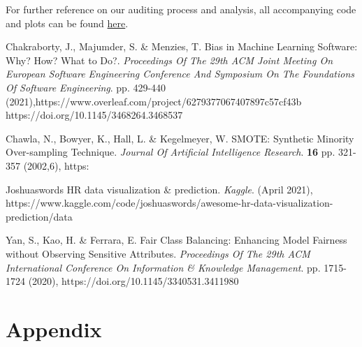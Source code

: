 For further reference on our auditing process and analysis, all accompanying code and plots can be found \href{https://github.com/cas2247/RDS_Algorithmic_Fairness}{here}.


\begin{thebibliography}{9}


%

Chakraborty, J., Majumder, S. \& Menzies, T. Bias in Machine Learning Software: Why? How? What to Do?. {\em Proceedings Of The 29th ACM Joint Meeting On European Software Engineering Conference And Symposium On The Foundations Of Software Engineering}. pp. 429-440 (2021),https://www.overleaf.com/project/6279377067407897c57cf43b https://doi.org/10.1145/3468264.3468537


Chawla, N., Bowyer, K., Hall, L. \& Kegelmeyer, W. SMOTE: Synthetic Minority Over-sampling Technique. {\em Journal Of Artificial Intelligence Research}. \textbf{16} pp. 321-357 (2002,6), https:%

Joshuaswords HR data visualization \& prediction. {\em Kaggle}. (April 2021), https://www.kaggle.com/code/joshuaswords/awesome-hr-data-visualization-prediction/data

Yan, S., Kao, H. \& Ferrara, E. Fair Class Balancing: Enhancing Model Fairness without Observing Sensitive Attributes. {\em Proceedings Of The 29th ACM International Conference On Information \& Knowledge Management}. pp. 1715-1724 (2020), https://doi.org/10.1145/3340531.3411980

\end{thebibliography}



\pagebreak
\section{Appendix}


